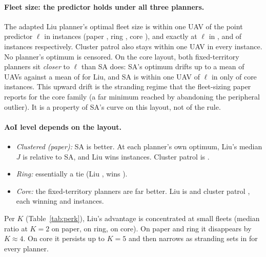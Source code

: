 \documentclass[10pt,a4paper]{article}
\begin{document}
\paragraph{Fleet size: the predictor holds under all three planners.}
The adapted Liu planner's optimal fleet size is within one UAV of the point predictor $\ell$ in
\fiftyLiuWOneRuleAll{} instances (paper \fiftypaperLiuWOneRule, ring \fiftyringLiuWOneRule, core
\fiftycoreLiuWOneRule), and exactly at $\ell$ in \fiftypaperLiuExRule, \fiftyringLiuExRule{} and
\fiftycoreLiuExRule{} of instances respectively. Cluster patrol also stays within one UAV in every
instance. No planner's optimum is censored. On the core layout, both fixed-territory planners sit
\emph{closer} to $\ell$ than SA does: SA's optimum drifts up to a mean of \fiftycoreSaAm{} UAVs against a
mean of \fiftycoreLiuAm{} for Liu, and SA is within one UAV of $\ell$ in only \fiftycoreSaWOneRule{} of
core instances. This upward drift is the stranding regime that the fleet-sizing paper reports for the core
family (a far minimum reached by abandoning the peripheral outlier). It is a property of SA's curve on this
layout, not of the rule.

\paragraph{AoI level depends on the layout.}
\begin{itemize}
\item \emph{Clustered (paper):} SA is better. At each planner's own optimum, Liu's median $J$ is
  \fiftypaperLiuGap{} relative to SA, and Liu wins \fiftypaperLiuBetter{} instances. Cluster patrol is
  \fiftypaperClGap{}.
\item \emph{Ring:} essentially a tie (Liu \fiftyringLiuGap, wins \fiftyringLiuBetter).
\item \emph{Core:} the fixed-territory planners are far better. Liu is \fiftycoreLiuGap{} and cluster patrol
  \fiftycoreClGap{}, each winning \fiftycoreLiuBetter{} and \fiftycoreClBetter{} instances.
\end{itemize}
Per $K$ (Table~\ref{tab:perk}), Liu's advantage is concentrated at small fleets (median ratio
\fiftypaperLiuKtwo{} at $K=2$ on paper, \fiftyringLiuKtwo{} on ring, \fiftycoreLiuKtwo{} on core). On
paper and ring it disappears by $K\approx4$. On core it persists up to $K=5$ and then narrows as stranding
sets in for every planner.
\end{document}

